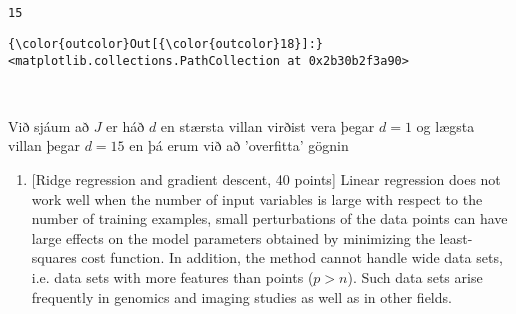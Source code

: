 \documentclass[11pt]{article}
\providecommand{\tightlist}{%
      \setlength{\itemsep}{0pt}\setlength{\parskip}{0pt}}
\begin{document}
    \begin{center}
    \end{center}
    { \hspace*{\fill} \\}
    
    \begin{center}
    \end{center}
    { \hspace*{\fill} \\}
    
    \begin{Verbatim}[commandchars=\\\{\}]
15

    \end{Verbatim}

\begin{Verbatim}[commandchars=\\\{\}]
{\color{outcolor}Out[{\color{outcolor}18}]:} <matplotlib.collections.PathCollection at 0x2b30b2f3a90>
\end{Verbatim}
            
    \begin{center}
    \end{center}
    { \hspace*{\fill} \\}
    
    Við sjáum að \(J\) er háð \(d\) en stærsta villan virðist vera þegar
\(d=1\) og lægsta villan þegar \(d=15\) en þá erum við að 'overfitta'
gögnin

    \begin{enumerate}
\def\labelenumi{\arabic{enumi})}
\setcounter{enumi}{3}
\tightlist
\item
  {[}Ridge regression and gradient descent, 40 points{]} Linear
  regression does not work well when the number of input variables is
  large with respect to the number of training examples, small
  perturbations of the data points can have large effects on the model
  parameters obtained by minimizing the least-squares cost function. In
  addition, the method cannot handle wide data sets, i.e. data sets with
  more features than points (\(p>n\)). Such data sets arise frequently
  in genomics and imaging studies as well as in other fields.
\end{enumerate}
\end{document}
